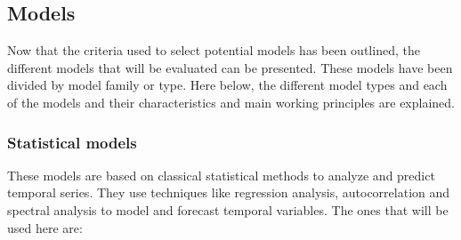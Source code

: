 \subsection{Models}
Now that the criteria used to select potential models has been outlined, the different models that will be evaluated can be presented. These models have been divided by model family or type. Here below, the different model types and each of the models and their characteristics and main working principles are explained. 
\subsubsection{Statistical models}
These models are based on classical statistical methods to analyze and predict temporal series. They use techniques like regression analysis, autocorrelation and spectral analysis to model and forecast temporal variables. The ones that will be used here are:

